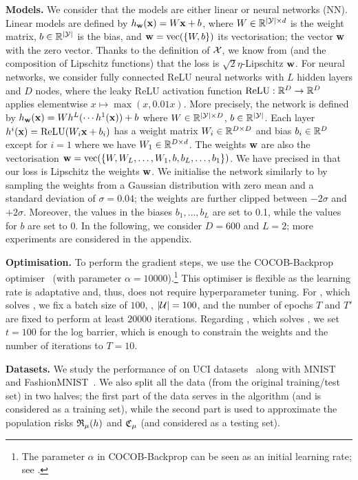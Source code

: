 \documentclass{article}
\begin{document}
\textbf{Models.} 
We consider that the models are either linear or neural networks (NN).
Linear models are defined by $h_{\mathbf{w}}(\mathbf{x})=W\mathbf{x}+b$, where $W\in\mathbb{R}^{|\mathcal{Y}|\times d}$ is the weight matrix, $b\in\mathbb{R}^{|\mathcal{Y}|}$ is the bias, and $\mathbf{w}=\operatorname*{\mathrm{vec}}(\{W, b\})$ its vectorisation; the vector $\mathbf{w}$ with the zero vector.
Thanks to the definition of $\mathcal{X}$, we know from  (and the composition of Lipschitz functions) that the loss is $\sqrt{2}\eta$-Lipschitz \wrt $\mathbf{w}$.
For neural networks, we consider fully connected ReLU neural networks with $L$ hidden layers and $D$ nodes, where the leaky ReLU activation function $\operatorname*{\mathrm{ReLU}}: \mathbb{R}^D\to\mathbb{R}^D$ applies elementwise $x\mapsto \max(x, 0.01x)$.
More precisely, the network is defined by $h_{\mathbf{w}}(\mathbf{x}) = Wh^{L}(\cdots h^{1}(\mathbf{x}))+b$ where $W\in \mathbb{R}^{|\mathcal{Y}|\times D}$, $b\in\mathbb{R}^{|\mathcal{Y}|}$. Each layer $h^{i}(\mathbf{x})=\operatorname*{\mathrm{ReLU}}(W_i\mathbf{x}+b_i)$ has a weight matrix $W_i\in \mathbb{R}^{D\times D}$ and bias $b_i\in \mathbb{R}^{D}$ except for $i=1$ where we have $W_1\in \mathbb{R}^{D\times d}$. 
The weights $\mathbf{w}$ are also the vectorisation $\mathbf{w}=\operatorname*{\mathrm{vec}}(\{W, W_{L}, \dots, W_1, b, b_{L}, \dots, b_1\})$. 
We have precised in  that our loss is Lipschitz \wrt the weights $\mathbf{w}$.
We initialise the network similarly to \cite{dziugaite2017computing} by sampling the weights from a Gaussian distribution with zero mean and a standard deviation of $\sigma=0.04$; the weights are further clipped between $-2\sigma$ and $+2\sigma$.
Moreover, the values in the biases $b_1,\dots, b_L$ are set to 0.1, while the values for $b$ are set to $0$.
In the following, we consider $D=600$ and $L=2$; more experiments are considered in the appendix.

\textbf{Optimisation.} 
To perform the gradient steps, we use the COCOB-Backprop optimiser~\cite{orabona2017training} (with parameter $\alpha=10000$).\footnote{The parameter $\alpha$ in COCOB-Backprop can be seen as an initial learning rate; see \cite{orabona2017training}.}
This optimiser is flexible as the learning rate is adaptative and, thus, does not require hyperparameter tuning.
For , which solves , we fix a batch size of $100$, \ie, $|\mathcal{U}|=100$, and the number of epochs $T$ and $T'$ are fixed to perform at least $20000$ iterations.
Regarding , which solves , we set $t=100$ for the log barrier, which is enough to constrain the weights and the number of iterations to $T=10$.

\textbf{Datasets.} 
We study the performance of  on UCI datasets~\citep{dua2017uci} along with MNIST~\citep{lecun1998mnist} and FashionMNIST~\citep{xiao2017fashion}.
We also split all the data (from the original training/test set) in two halves; the first part of the data serves in the algorithm (and is considered as a training set), while the second part is used to approximate the population risks $\mathfrak{R}_{\mu}(h)$ and $\mathfrak{C}_{\mu}$ (and considered as a testing set).
\end{document}
